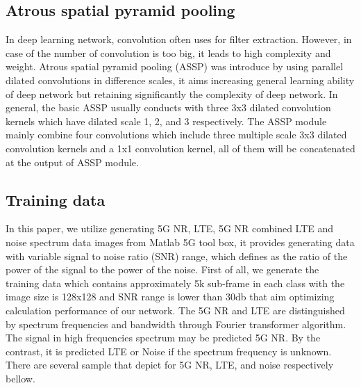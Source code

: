 \documentclass[journal]{IEEEtran} %
\begin{document}
\subsection{Atrous spatial pyramid pooling}
In deep learning network, convolution often uses for filter extraction. However, in case of the number of convolution is too big, it leads to high complexity and weight. Atrous spatial pyramid pooling (ASSP) \cite{b10} was introduce by using parallel dilated convolutions in difference scales, it aims increasing general learning ability of deep network but retaining significantly the complexity of deep network. In general, the basic ASSP usually conducts with three 3x3 dilated convolution kernels which have dilated scale 1, 2, and 3 respectively. The ASSP module mainly combine four convolutions which include three multiple scale 3x3 dilated convolution kernels and a 1x1 convolution kernel, all of them will be concatenated at the output of ASSP module.


\subsection{Training data}
In this paper, we utilize generating 5G NR, LTE, 5G NR combined LTE and noise spectrum data images from Matlab 5G tool box, it provides generating data with variable signal to noise ratio (SNR) range, which defines as the ratio of the power of the signal to the power of the noise. First of all, we generate the training data which contains approximately 5k sub-frame in each class with the image size is 128x128 and SNR range is lower than 30db that aim optimizing calculation performance of our network. The 5G NR and LTE are distinguished by spectrum frequencies and bandwidth through Fourier transformer algorithm. The signal in high frequencies spectrum may be predicted 5G NR. By the contrast, it is predicted LTE or Noise if the spectrum frequency is unknown. There are several sample that depict for 5G NR, LTE, and noise respectively bellow.
\end{document}
